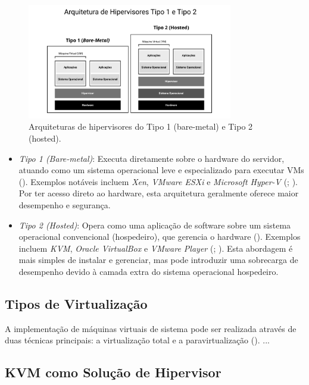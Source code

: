 \begin{itemize}
\begin{figure}[htb]
    \centering
    \includegraphics[width=0.8\textwidth]{figuras/Figura 2 - Arquitetura de Hipervisores.png}
    \caption{Arquiteturas de hipervisores do Tipo 1 (bare-metal) e Tipo 2 (hosted).}
    \label{fig:arquitetura-hipervisores}
\end{figure}

\begin{itemize}
    \item \emph{Tipo 1 (Bare-metal)}: Executa diretamente sobre o hardware do servidor, atuando como um sistema operacional leve e especializado para executar VMs (\cite{chawla2025}). Exemplos notáveis incluem \textit{Xen}, \textit{VMware ESXi} e \textit{Microsoft Hyper-V} (\cite{chawla2025}; \cite{carissimi2008}). Por ter acesso direto ao hardware, esta arquitetura geralmente oferece maior desempenho e segurança.
    \item \emph{Tipo 2 (Hosted)}: Opera como uma aplicação de software sobre um sistema operacional convencional (hospedeiro), que gerencia o hardware (\cite{chawla2025}). Exemplos incluem \textit{KVM}, \textit{Oracle VirtualBox} e \textit{VMware Player} (\cite{chawla2025}; \cite{carissimi2008}). Esta abordagem é mais simples de instalar e gerenciar, mas pode introduzir uma sobrecarga de desempenho devido à camada extra do sistema operacional hospedeiro.
\end{itemize}

\subsection{Tipos de Virtualização}
A implementação de máquinas virtuais de sistema pode ser realizada através de duas técnicas principais: a virtualização total e a paravirtualização (\cite{carissimi2008}).
{{ ... }}

\subsection{KVM como Solução de Hipervisor}


\end{itemize}
